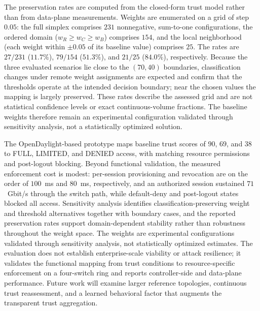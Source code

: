The preservation rates are computed from the closed-form trust model rather than
from data-plane measurements. Weights are enumerated on a grid of step $0.05$:
the full simplex comprises $231$ nonnegative, sum-to-one configurations, the
ordered domain ($w_R \ge w_C \ge w_B$) comprises $154$, and the local
neighborhood (each weight within $\pm 0.05$ of its baseline value) comprises
$25$. The rates are $27/231$ ($11.7\%$), $79/154$ ($51.3\%$), and $21/25$
($84.0\%$), respectively. Because the three evaluated scenarios lie close to the
$(70,40)$ boundaries, classification changes under remote weight assignments are
expected and confirm that the thresholds operate at the intended decision
boundary; near the chosen values the mapping is largely preserved. These rates
describe the assessed grid and are not statistical confidence levels or exact
continuous-volume fractions. The baseline weights therefore remain an
experimental configuration validated through sensitivity analysis, not a
statistically optimized solution.


The OpenDaylight-based prototype maps baseline trust scores of $90$, $69$, and
$38$ to FULL, LIMITED, and DENIED access, with matching resource permissions and
post-logout blocking. Beyond functional validation, the measured enforcement
cost is modest: per-session provisioning and revocation are on the order of
$100$~ms and $80$~ms, respectively, and an authorized session sustained
$71$~Gbit/s through the switch path, while default-deny and post-logout states
blocked all access. Sensitivity analysis identifies classification-preserving
weight and threshold alternatives together with boundary cases, and the reported
preservation rates support domain-dependent stability rather than robustness
throughout the weight space. The weights are experimental configurations
validated through sensitivity analysis, not statistically optimized estimates.
The evaluation does not establish enterprise-scale viability or attack
resilience; it validates the functional mapping from trust conditions to
resource-specific enforcement on a four-switch ring and reports controller-side
and data-plane performance. Future work will examine larger reference
topologies, continuous trust reassessment, and a learned behavioral factor that
augments the transparent trust aggregation.

